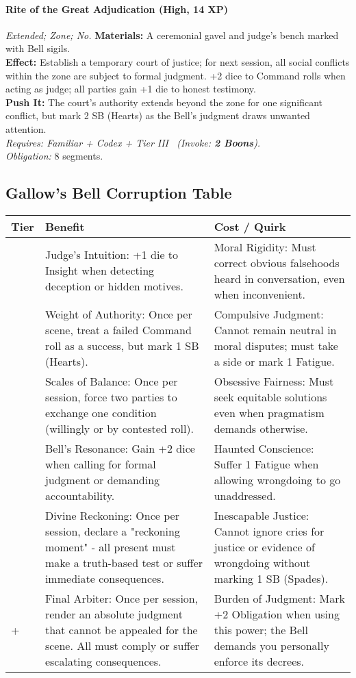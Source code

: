 \paragraph{Rite of the Great Adjudication (High, 14 XP)} \emph{Extended; Zone; No.}
\textbf{Materials:} A ceremonial gavel and judge's bench marked with Bell sigils. \\
\textbf{Effect:} Establish a temporary court of justice; for next session, all social conflicts within the zone are subject to formal judgment. +2 dice to Command rolls when acting as judge; all parties gain +1 die to honest testimony. \\
\textbf{Push It:} The court's authority extends beyond the zone for one significant conflict, but mark 2 SB (Hearts) as the Bell's judgment draws unwanted attention. \\
\emph{Requires: Familiar + Codex + Tier III \ (\textit{Invoke:} \textbf{2 Boons}).} \\
\emph{Obligation:} 8 segments.

\subsection*{Gallow's Bell Corruption Table}
\label{sec:gallows-bell-corruption}

\begin{longtable}{>{\raggedright\arraybackslash}p{1cm} p{5cm} p{5cm}}
\toprule
\textbf{Tier} & \textbf{Benefit} & \textbf{Cost / Quirk} \\
\midrule
1 & Judge's Intuition: +1 die to Insight when detecting deception or hidden motives. & Moral Rigidity: Must correct obvious falsehoods heard in conversation, even when inconvenient. \\
\midrule
2 & Weight of Authority: Once per scene, treat a failed Command roll as a success, but mark 1 SB (Hearts). & Compulsive Judgment: Cannot remain neutral in moral disputes; must take a side or mark 1 Fatigue. \\
\midrule
3 & Scales of Balance: Once per session, force two parties to exchange one condition (willingly or by contested roll). & Obsessive Fairness: Must seek equitable solutions even when pragmatism demands otherwise. \\
\midrule
4 & Bell's Resonance: Gain +2 dice when calling for formal judgment or demanding accountability. & Haunted Conscience: Suffer 1 Fatigue when allowing wrongdoing to go unaddressed. \\
\midrule
5 & Divine Reckoning: Once per session, declare a "reckoning moment" - all present must make a truth-based test or suffer immediate consequences. & Inescapable Justice: Cannot ignore cries for justice or evidence of wrongdoing without marking 1 SB (Spades). \\
\midrule
6+ & Final Arbiter: Once per session, render an absolute judgment that cannot be appealed for the scene. All must comply or suffer escalating consequences. & Burden of Judgment: Mark +2 Obligation when using this power; the Bell demands you personally enforce its decrees. \\
\bottomrule
\end{longtable}